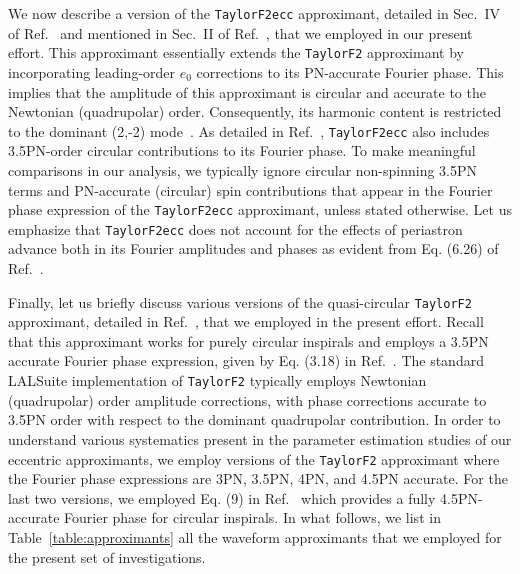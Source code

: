 \documentclass[aps,prd,twocolumn,superscriptaddress,groupedaddress,nofootinbib,showpacs,eqsecnum,useAms]{revtex4-2}
\begin{document}
\endgroup
We now describe a version of the \texttt{TaylorF2ecc} approximant, detailed in Sec.~IV of Ref.~\cite{MF16} and mentioned in Sec.~II of Ref.~\cite{Favata2022}, that we employed in our present effort. This approximant essentially extends the \texttt{TaylorF2} approximant by incorporating leading-order $e_0$ corrections to its PN-accurate Fourier phase. This implies that the amplitude of this approximant is circular and accurate to the Newtonian (quadrupolar) order. Consequently, its harmonic content is restricted to the dominant (2,-2) mode~\cite{Favata2022}. As detailed in Ref.~\cite{MF16}, \texttt{TaylorF2ecc} also includes 3.5PN-order circular contributions to its Fourier phase. 
To make 
meaningful comparisons in our analysis, we typically ignore circular non-spinning 3.5PN terms and PN-accurate (circular) spin contributions that appear in the Fourier phase expression of the \texttt{TaylorF2ecc} approximant, unless stated otherwise. 
Let us emphasize that 
\texttt{TaylorF2ecc} does not account for the effects of periastron advance both in its Fourier amplitudes and phases as evident from Eq. (6.26) of Ref.~\cite{MF16}.

Finally, let us briefly discuss various versions of the quasi-circular  \texttt{TaylorF2} approximant, detailed in Ref.~\cite{BIOPS}, that we employed in the present effort. Recall that this approximant works for purely circular inspirals and employs a 3.5PN accurate Fourier phase expression, given by Eq. (3.18) in Ref.~\cite{BIOPS}. The standard LALSuite implementation of \texttt{TaylorF2} typically employs Newtonian (quadrupolar) order amplitude corrections, with phase corrections accurate to 3.5PN order with respect to the  dominant quadrupolar contribution. In order to understand various systematics present in the parameter estimation studies of our eccentric approximants, we employ versions of the \texttt{TaylorF2} approximant where the Fourier phase expressions are 3PN, 3.5PN, 4PN, and 4.5PN accurate. For the last two versions, we employed Eq. (9) in Ref.~\cite{B45PN_23} which provides a fully 4.5PN-accurate Fourier phase for circular inspirals. In what follows, we list in Table~\ref{table:approximants} all the waveform approximants that we employed for the present set of investigations.\\
\end{document}
